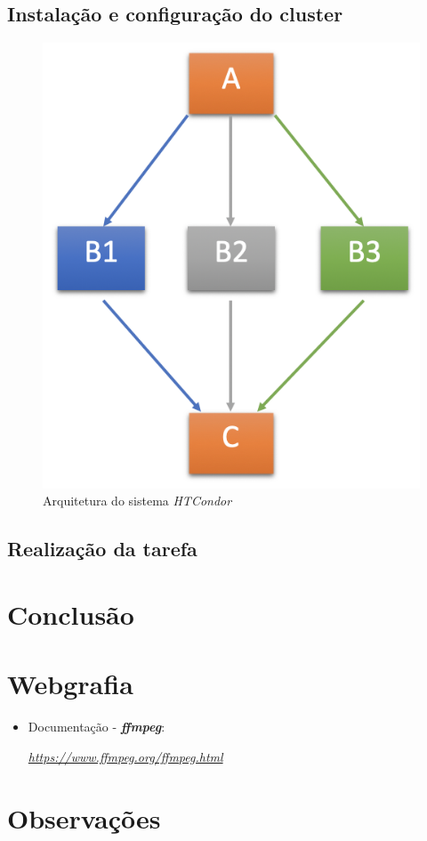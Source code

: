\documentclass[a4paper]{report}
\begin{document}
    \section{Instalação e configuração do cluster}
	
	\begin{figure}[h]
		\centering
		\includegraphics[scale=0.5]{Arquitetura-HTCondor.png}
		\caption{Arquitetura do sistema \textit{HTCondor}}
		\label{}
	\end{figure}
    
    \section{Realização da tarefa}

\chapter{Conclusão}
\large{

}

\chapter{Webgrafia}
    \begin{itemize}
        \item Documentação - \textbf{\textit{ffmpeg}}:
        \par \textit{\url{https://www.ffmpeg.org/ffmpeg.html}}
    \end{itemize}

\appendix
\chapter{Observações}
\end{document}
